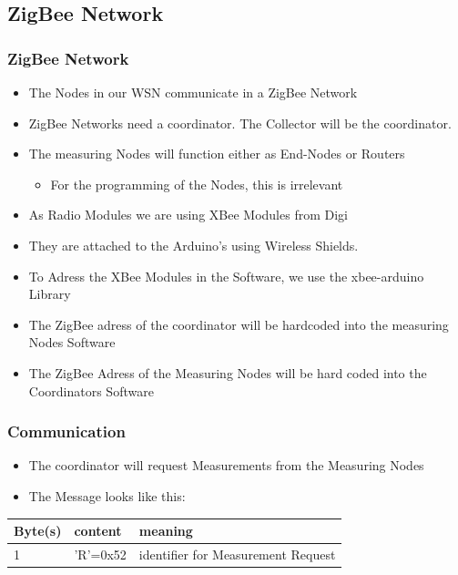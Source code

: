 \documentclass{beamer}
\begin{document}
\subsection{ZigBee Network}
\frame
{
	\frametitle{ZigBee Network}
	
	\begin{itemize}
	
	\item The Nodes in our WSN communicate in a ZigBee Network
	\item ZigBee Networks need a coordinator. The Collector will be the coordinator.
	\item The measuring Nodes will function either as End-Nodes or Routers
	\begin{itemize}
		\item{For the programming of the Nodes, this is irrelevant}
	\end{itemize}
	
	\end{itemize}
}

\frame
{
	\begin{itemize}
	
	\item As Radio Modules we are using XBee Modules from Digi
	\item They are attached to the Arduino's using Wireless Shields.
	\item To Adress the XBee Modules in the Software, we use the xbee-arduino Library
	\item The ZigBee adress of the coordinator will be hardcoded into the measuring Nodes Software
	\item The ZigBee Adress of the Measuring Nodes will be hard coded into the Coordinators Software
	\end{itemize}
}

\frame
{
	\frametitle{Communication}

	\begin{itemize}
	\item The coordinator will request Measurements from the Measuring Nodes
	\item The Message looks like this:
	\end{itemize}
	
	\begin{table}
    \begin{tabular}{|l|l|l|}
    \hline
    Byte(s) & content  & meaning                            \\ \hline
    1       & 'R'=0x52 & identifier for Measurement Request \\ \hline
    \end{tabular}
	\end{table}
}
\end{document}
